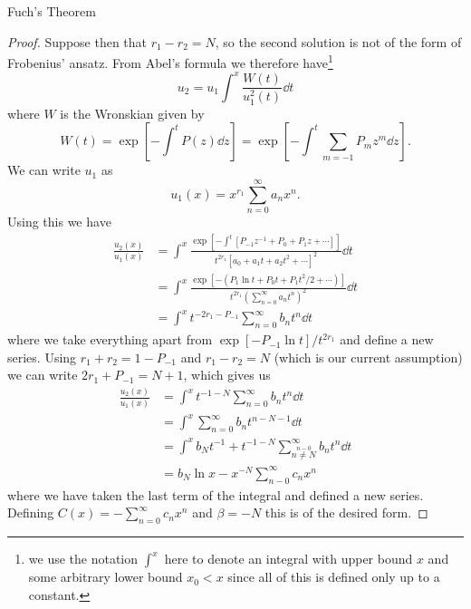 \documentclass[fleqn]{NotesClass}
\begin{document}
\begin{thm}{Fuch's Theorem}{}
\begin{proof}
            Suppose then that \(r_1 - r_2 = N\), so the second solution is not of the form of Frobenius' ansatz.
            From Abel's formula we therefore have\footnote{we use the notation \(\int^x\) here to denote an integral with upper bound \(x\) and some arbitrary lower bound \(x_0 < x\) since all of this is defined only up to a constant.}
            \begin{equation}
                u_2 = u_1 \int^x \frac{W(t)}{u_1^2(t)} \dd{t}
            \end{equation}
            where \(W\) is the Wronskian given by
            \begin{equation}
                W(t) = \exp[-\int^{t} P(z) \dd{z}] = \exp[-\int^t \sum_{m=-1} P_mz^m \dd{z}].
            \end{equation}
            We can write \(u_1\) as
            \begin{equation}
                u_1(x) = x^{r_1} \sum_{n=0}^{\infty} a_nx^n.
            \end{equation}
            Using this we have
            \begin{align}
                \frac{u_2(x)}{u_1(x)} &= \int^x \frac{\exp[-\int^t [P_{-1}z^{-1} + P_0 + P_1z + \dotsb]]}{t^{2r_1}[a_0 + a_1 t + a_2 t^2 + \dotsb]^2} \dd{t}\\
                &= \int^x \frac{\exp[-(P_1\ln t + P_0t + P_1t^2/2 + \dotsb)]}{t^{2r_1}\left( \sum_{n=0}^{\infty} a_nt^n \right)^2} \dd{t}\\
                &= \int^x t^{-2r_1-P_{-1}} \sum_{n=0}^{\infty} b_nt^n \dd{t}
            \end{align}
            where we take everything apart from \(\exp[-P_{-1}\ln t]/t^{2r_1}\) and define a new series.
            Using \(r_1 + r_2 = 1 - P_{-1}\) and \(r_1 - r_2 = N\) (which is our current assumption) we can write \(2r_1 + P_{-1} = N + 1\), which gives us
            \begin{align}
                \frac{u_2(x)}{u_1(x)} &= \int^x t^{-1-N} \sum_{n=0}^{\infty} b_nt^n \dd{t}\\
                &= \int^x \sum_{n=0}^{\infty} b_n t^{n-N-1} \dd{t}\\
                &= \int^x b_Nt^{-1} + t^{-1-N} \sum_{\stackrel{n-0}{n\ne N}}^{\infty} b_nt^n \dd{t}\\
                &= b_N\ln x - x^{-N}\sum_{n-0}^{\infty} c_n x^n
            \end{align}
            where we have taken the last term of the integral and defined a new series.
            Defining \(C(x) = -\sum_{n=0}^{\infty} c_nx^n\) and \(\beta = -N\) this is of the desired form.
        \end{proof}
    \end{thm}
    
\end{document}
